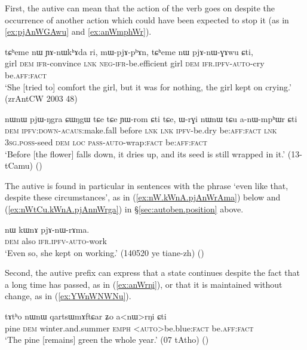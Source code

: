 First, the autive can mean that the action of the verb goes on despite the occurrence of another action which could have been expected to stop it (as in \ref{ex:pjAnWGAwu} and \ref{ex:anWmphWr}).  

\begin{exe}
\ex \label{ex:pjAnWGAwu}
\gll tɕʰeme nɯ ɲɤ-nɯkʰɤda ri, mɯ-pjɤ-pʰɤn, tɕʰeme nɯ pjɤ-nɯ-ɣɤwu ɕti, \\
girl \textsc{dem} \textsc{ifr}-convince \textsc{lnk} \textsc{neg}-\textsc{ifr}-be.efficient girl \textsc{dem} \textsc{ifr}.\textsc{ipfv}-\textsc{auto}-cry  be.\textsc{aff}:\textsc{fact} \\
\glt `She [tried to] comfort the girl, but it was for nothing, the girl kept on crying.' (zrAntCW 2003 48)
\end{exe} 

\begin{exe}
\ex \label{ex:anWmphWr}
\gll nɯnɯ pjɯ-ŋgra ɕɯŋgɯ tɕe tɕe ɲɯ-rom ɕti tɕe, ɯ-rɣi nɯnɯ tɕu a-nɯ-mpʰɯr ɕti \\
\textsc{dem} \textsc{ipfv}:\textsc{down}-\textsc{acaus}:make.fall before \textsc{lnk}  \textsc{lnk} \textsc{ipfv}-be.dry be:\textsc{aff}:\textsc{fact} \textsc{lnk} \textsc{3sg}.\textsc{poss}-seed \textsc{dem} \textsc{loc} \textsc{pass}-\textsc{auto}-wrap:\textsc{fact} be:\textsc{aff}:\textsc{fact} \\
\glt `Before [the flower] falls down, it dries up, and its seed is still wrapped in it.' (13-tCamu)
()
\end{exe} 

The autive is found in particular in sentences with the phrase  `even like that, despite these circumstances', as in (\ref{ex:nW.kWnA.pjAnWrAma}) below and (\ref{ex:nWtCu.kWnA.pjAnnWrga}) in §\ref{sec:autoben.position} above.

\begin{exe}
\ex \label{ex:nW.kWnA.pjAnWrAma}
\gll  nɯ kɯnɤ pjɤ-nɯ-rɤma. \\
 \textsc{dem} also \textsc{ifr}.\textsc{ipfv}-\textsc{auto}-work \\ 
\glt `Even so, she kept on working.' (140520 ye tiane-zh) ()
\end{exe} 
 
Second, the autive  prefix can express that a state continues despite the fact that a long time has passed, as in (\ref{ex:anWrŋi}), or that it is maintained without change, as in (\ref{ex:YWnWNWNu}).

\begin{exe}
\ex \label{ex:anWrŋi}
\gll tɤtʰo nɯnɯ qartsɯmɤftɕar ʑo a<nɯ>rŋi ɕti \\
pine \textsc{dem} winter.and.summer \textsc{emph} <\textsc{auto}>be.blue:\textsc{fact} be.\textsc{aff}:\textsc{fact} \\
\glt `The pine [remains] green the whole year.' (07 tAtho)
()
\end{exe}
 

